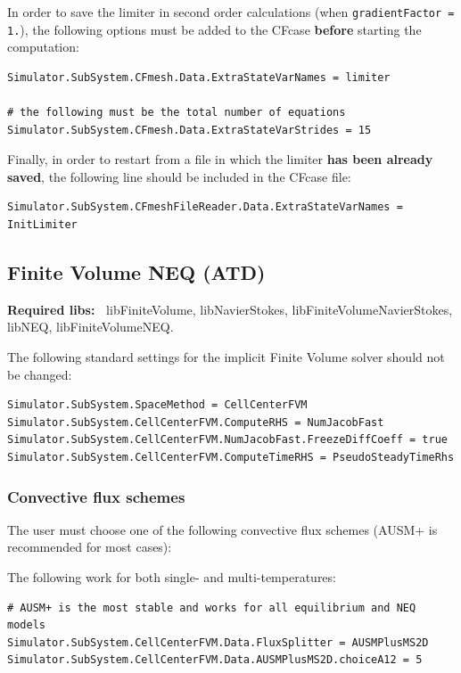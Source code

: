 \documentclass[11pt]{article}
\begin{document}
In order to save the limiter in second order calculations (when {\tt gradientFactor = 1.}), the following options must be added to the CFcase {\bf before} 
starting the computation:

\begin{verbatim}
Simulator.SubSystem.CFmesh.Data.ExtraStateVarNames = limiter

# the following must be the total number of equations
Simulator.SubSystem.CFmesh.Data.ExtraStateVarStrides = 15
\end{verbatim}

Finally, in order to restart from a file in which the limiter {\bf has been already saved}, 
the following line should be included in the CFcase file:

\begin{verbatim}
Simulator.SubSystem.CFmeshFileReader.Data.ExtraStateVarNames = InitLimiter
\end{verbatim}

\subsection{Finite Volume NEQ (ATD)}

{\bf Required libs:~} libFiniteVolume, libNavierStokes, libFiniteVolumeNavierStokes, libNEQ,  libFiniteVolumeNEQ. 

The following standard settings for the implicit Finite Volume solver should not be changed:

\begin{verbatim}
Simulator.SubSystem.SpaceMethod = CellCenterFVM
Simulator.SubSystem.CellCenterFVM.ComputeRHS = NumJacobFast
Simulator.SubSystem.CellCenterFVM.NumJacobFast.FreezeDiffCoeff = true
Simulator.SubSystem.CellCenterFVM.ComputeTimeRHS = PseudoSteadyTimeRhs
\end{verbatim}

\subsubsection{Convective flux schemes}

The user must choose one of the following convective flux schemes (AUSM+ is recommended for most cases):

The following work for both single- and multi-temperatures:
\begin{verbatim}
# AUSM+ is the most stable and works for all equilibrium and NEQ models
Simulator.SubSystem.CellCenterFVM.Data.FluxSplitter = AUSMPlusMS2D
Simulator.SubSystem.CellCenterFVM.Data.AUSMPlusMS2D.choiceA12 = 5
\end{verbatim}
\end{document}
